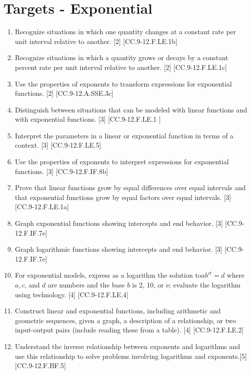 \documentclass{article}
\begin{document}
\section{Targets - Exponential}
\begin{enumerate}
	\item Recognize situations in which one quantity changes at a constant rate per unit interval relative to another. [2] [CC.9-12.F.LE.1b]
	\item Recognize situations in which a quantity grows or decays by a constant percent rate per unit interval relative to another. [2] [CC.9-12.F.LE.1c]
	\item Use the properties of exponents to transform expressions for exponential functions. [2] [CC.9-12.A.SSE.3c]
	\item Distinguish between situations that can be modeled with linear functions and with exponential functions. [3] [CC.9-12.F.LE.1 ]
	\item Interpret the parameters in a linear or exponential function in terms of a context. [3] [CC.9-12.F.LE.5]
	\item Use the properties of exponents to interpret expressions for exponential functions. [3] [CC.9-12.F.IF.8b]
	\item Prove that linear functions grow by equal differences over equal intervals and that exponential functions grow by equal factors over equal intervals. [3] [CC.9-12.F.LE.1a]
	\item Graph exponential functions showing intercepts and end behavior. [3] [CC.9-12.F.IF.7e]
	\item Graph logarithmic functions showing intercepts and end behavior. [3] [CC.9-12.F.IF.7e]
	\item For exponential models, express as a logarithm the solution to$ ab^{ct} = d$ where $a, c$, and $d$ are numbers and the base $b$ is 2, 10, or e; evaluate the logarithm using technology. [4] [CC.9-12.F.LE.4]
	\item Construct linear and exponential functions, including arithmetic and geometric sequences, given a graph, a description of a relationship, or two input-output pairs (include reading these from a table). [4] [CC.9-12.F.LE.2]
	\item Understand the inverse relationship between exponents and logarithms and use this relationship to solve problems involving logarithms and exponents.[5] [CC.9-12.F.BF.5]
\end{enumerate}
\newpage
\end{document}
